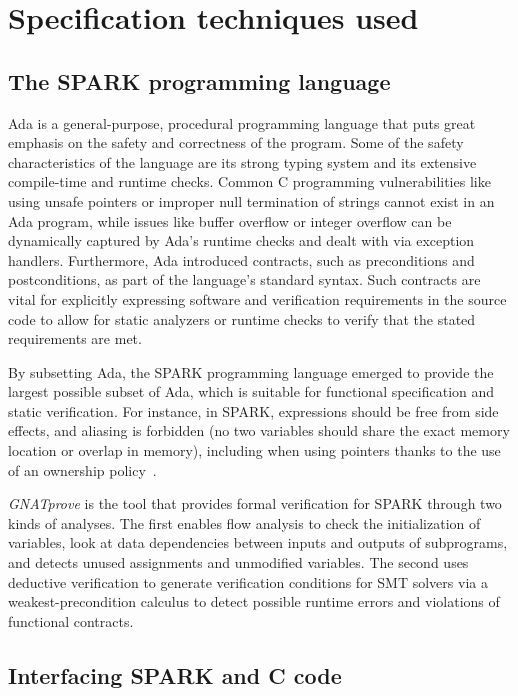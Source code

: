 \documentclass[conference]{IEEEtran}
\begin{document}
\section{Specification techniques used}
\label{sec:spec}

\subsection{The SPARK programming language}

Ada is a general-purpose, procedural programming language that puts great emphasis on the safety and correctness of the program. Some of the safety characteristics of the language are its strong typing system and its extensive compile-time and runtime checks. Common C programming vulnerabilities like using unsafe pointers or improper null termination of strings cannot exist in an Ada program, while issues like buffer overflow or integer overflow can be dynamically captured by Ada’s runtime checks and dealt with via exception handlers. Furthermore, Ada introduced contracts, such as preconditions and postconditions, as part of the language’s standard syntax. Such contracts are vital for explicitly expressing software and verification requirements in the source code to allow for static analyzers or runtime checks to verify that the stated requirements are met.

By subsetting Ada, the SPARK programming language \cite{mccormick_chapin_2015} emerged to provide the largest possible subset of Ada, which is suitable for functional specification and static verification. For instance, in SPARK, expressions should be free from side effects, and aliasing is forbidden (no two variables should share the exact memory location or overlap in memory), including when using pointers thanks to the use of an ownership policy~\cite{dross2020recursive}.

\emph{GNATprove} \cite{GNATProve:users_manual} is the tool that provides formal verification for SPARK through two kinds of analyses. The first enables flow analysis to check the initialization of variables, look at data dependencies between inputs and outputs of subprograms, and detects unused assignments and unmodified variables. The second uses deductive verification to generate verification conditions for SMT solvers via a weakest-precondition calculus to detect possible runtime errors and violations of functional contracts.



\subsection{Interfacing SPARK and C code}
\end{document}
